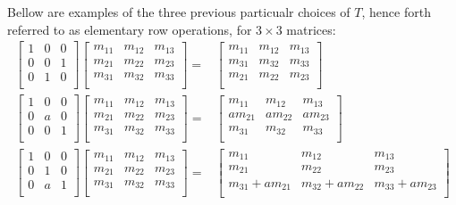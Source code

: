 Bellow are examples of the three previous particualr choices of $T$,
hence forth referred to as elementary row operations,
for $3\times 3$ matrices:
\begin{equation*}
\begin{aligned}
\begin{bmatrix}
	1&0&0 \\
	0&0&1 \\
	0&1&0 \\
\end{bmatrix}
\begin{bmatrix}
	m_{11} & m_{12} & m_{13} \\
	m_{21} & m_{22} & m_{23} \\
	m_{31} & m_{32} & m_{33} \\
\end{bmatrix}
=&
\begin{bmatrix}
	m_{11} & m_{12} & m_{13} \\
	m_{31} & m_{32} & m_{33} \\
	m_{21} & m_{22} & m_{23} \\
\end{bmatrix} \\
\begin{bmatrix}
	1&0&0 \\
	0&a&0 \\
	0&0&1 \\
\end{bmatrix}
\begin{bmatrix}
	m_{11} & m_{12} & m_{13} \\
	m_{21} & m_{22} & m_{23} \\
	m_{31} & m_{32} & m_{33} \\
\end{bmatrix}
=&
\begin{bmatrix}
	m_{11} & m_{12} & m_{13} \\
	am_{21} & am_{22} & am_{23} \\
	m_{31} & m_{32} & m_{33} \\
\end{bmatrix} \\
\begin{bmatrix}
	1&0&0 \\
	0&1&0 \\
	0&a&1 \\
\end{bmatrix}
\begin{bmatrix}
	m_{11} & m_{12} & m_{13} \\
	m_{21} & m_{22} & m_{23} \\
	m_{31} & m_{32} & m_{33} \\
\end{bmatrix}
=&
\begin{bmatrix}
	m_{11} & m_{12} & m_{13} \\
	m_{21} & m_{22} & m_{23} \\
	m_{31}+am_{21} & m_{32}+am_{22} & m_{33}+am_{23} \\
\end{bmatrix} \\
\end{aligned}
\end{equation*}

